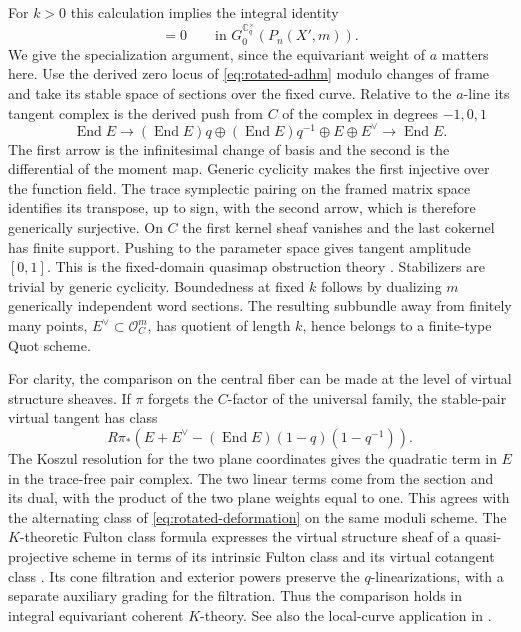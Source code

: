 For \(k>0\) this calculation implies the integral identity
\begin{equation}
 [\mathcal O^{\mathrm{vir}}_{P_n(X',m)}]=0
 \qquad\text{in }G_0^{\mathbb C^\times_q}(P_n(X',m)).
 \label{eq:rotated-vanishing}
\end{equation}
We give the specialization argument, since the equivariant weight of
\(a\) matters here. Use the derived zero locus of
\eqref{eq:rotated-adhm} modulo changes of frame and take its stable space
of sections over the fixed curve. Relative to the \(a\)-line its tangent
complex is the derived push from \(C\) of the complex in degrees
\(-1,0,1\)
\begin{equation}
 \operatorname{End}E
 \longrightarrow (\operatorname{End}E)q\oplus
  (\operatorname{End}E)q^{-1}\oplus E\oplus E^\vee
 \longrightarrow \operatorname{End}E .
 \label{eq:rotated-deformation}
\end{equation}
The first arrow is the infinitesimal change of basis and the second is
the differential of the moment map. Generic cyclicity makes the first
injective over the function field. The trace symplectic pairing on the
framed matrix space identifies its transpose, up to sign, with the
second arrow, which is therefore generically surjective. On \(C\) the
first kernel sheaf vanishes and the last cokernel has finite support.
Pushing to the parameter space gives tangent amplitude \([0,1]\).
This is the fixed-domain quasimap obstruction theory
\cite[\S4.3]{okounkov}. Stabilizers are trivial by generic cyclicity.
Boundedness at fixed \(k\) follows by dualizing \(m\) generically
independent word sections. The resulting subbundle away from finitely
many points, \(E^\vee\subset\mathcal O_C^m\), has quotient of length
\(k\), hence belongs to a finite-type Quot scheme.

For clarity, the comparison on the central fiber can be made at the
level of virtual structure sheaves. If \(\pi\) forgets the \(C\)-factor
of the universal family, the stable-pair virtual tangent has class
\begin{equation}
 R\pi_*\!\left(E+E^\vee-
       (\operatorname{End}E)(1-q)(1-q^{-1})\right).
 \label{eq:rotated-tangent}
\end{equation}
The Koszul resolution for the two plane coordinates gives the quadratic
term in \(E\) in the trace-free pair complex. The two linear terms come
from the section and its dual, with the product of the two plane weights
equal to one. This agrees with the alternating class of
\eqref{eq:rotated-deformation} on the same moduli scheme. The
\(K\)-theoretic Fulton class formula expresses the virtual structure
sheaf of a quasi-projective scheme in terms of its intrinsic Fulton
class and its virtual cotangent class
\cite[Theorem~4.2 and Corollary~4.5]{thomas}. Its cone filtration and
exterior powers preserve the \(q\)-linearizations, with a separate
auxiliary grading for the filtration. Thus the comparison holds in
integral equivariant coherent \(K\)-theory. See also the local-curve
application in \cite[\S9]{monavari}.

